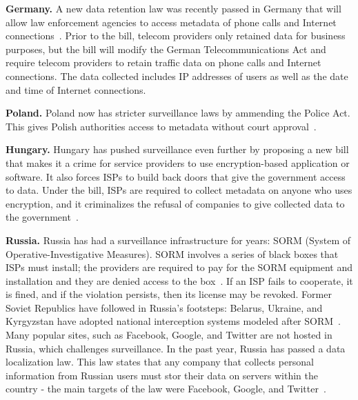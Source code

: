 {\bf Germany.} A new data retention law was recently passed in Germany that will allow law enforcement agencies to access metadata of phone calls and Internet connections~\cite{germansurv}.  Prior to the bill, telecom providers only retained data for business purposes, but the bill will modify the German Telecommunications Act and require telecom providers to retain traffic data on phone calls and Internet connections.  The data collected includes IP addresses of users as well as the date and time of Internet connections.

{\bf Poland.}  Poland now has stricter surveillance laws by ammending the Police Act.  This gives Polish authorities access to metadata without court approval~\cite{francesurv2}.

{\bf Hungary.}  Hungary has pushed surveillance even further by proposing a new bill that makes it a crime for service providers to use encryption-based application or software.  It also forces ISPs to build back doors that give the government access to data.  Under the bill, ISPs are required to collect metadata on anyone who uses encryption, and it criminalizes the refusal of companies to give collected data to the government~\cite{francesurv2}.

{\bf Russia.} Russia has had a surveillance infrastructure for years: SORM (System of Operative-Investigative Measures).  SORM involves a series of black boxes that ISPs must install; the providers are required to pay for the SORM equipment and installation and they are denied access to the box~\cite{russiasurv}.  If an ISP fails to cooperate, it is fined, and if the violation persists, then its license may be revoked.  Former Soviet Republics have followed in Russia's footsteps: Belarus, Ukraine, and Kyrgyzstan have adopted national interception systems modeled after SORM~\cite{russiasurv}.  Many popular sites, such as Facebook, Google, and Twitter are not hosted in Russia, which challenges surveillance.  In the past year, Russia has passed a data localization law.  This law states that any company that collects personal information from Russian users must stor their data on servers within the country - the main targets of the law were Facebook, Google, and Twitter~\cite{russiasurv2}. 
